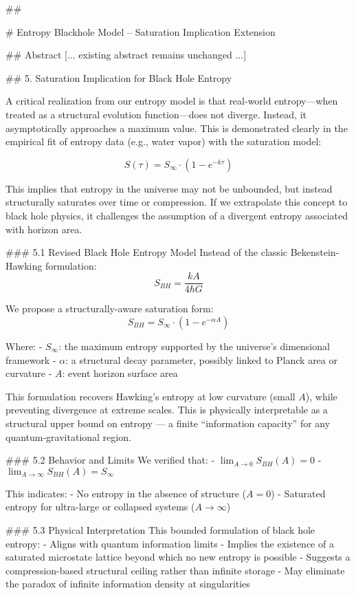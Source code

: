 ##

# Entropy Blackhole Model – Saturation Implication Extension

## Abstract
[... existing abstract remains unchanged ...]

## 5. Saturation Implication for Black Hole Entropy

A critical realization from our entropy model is that real-world entropy—when treated as a structural evolution function—does not diverge. Instead, it asymptotically approaches a maximum value. This is demonstrated clearly in the empirical fit of entropy data (e.g., water vapor) with the saturation model:

\[
S(\tau) = S_{\infty} \cdot \left(1 - e^{-k \tau} \right)
\]

This implies that entropy in the universe may not be unbounded, but instead structurally saturates over time or compression. If we extrapolate this concept to black hole physics, it challenges the assumption of a divergent entropy associated with horizon area.

### 5.1 Revised Black Hole Entropy Model
Instead of the classic Bekenstein-Hawking formulation:
\[
S_{BH} = \frac{k A}{4 \hbar G}
\]

We propose a structurally-aware saturation form:
\[
S_{BH} = S_{\infty} \cdot \left(1 - e^{-\alpha A} \right)
\]

Where:
- \( S_{\infty} \): the maximum entropy supported by the universe’s dimensional framework
- \( \alpha \): a structural decay parameter, possibly linked to Planck area or curvature
- \( A \): event horizon surface area

This formulation recovers Hawking’s entropy at low curvature (small \( A \)), while preventing divergence at extreme scales. This is physically interpretable as a structural upper bound on entropy — a finite “information capacity” for any quantum-gravitational region.

### 5.2 Behavior and Limits
We verified that:
- \( \lim_{A \to 0} S_{BH}(A) = 0 \)
- \( \lim_{A \to \infty} S_{BH}(A) = S_{\infty} \)

This indicates:
- No entropy in the absence of structure (\( A = 0 \))
- Saturated entropy for ultra-large or collapsed systems (\( A \to \infty \))

### 5.3 Physical Interpretation
This bounded formulation of black hole entropy:
- Aligns with quantum information limits
- Implies the existence of a saturated microstate lattice beyond which no new entropy is possible
- Suggests a compression-based structural ceiling rather than infinite storage
- May eliminate the paradox of infinite information density at singularities

